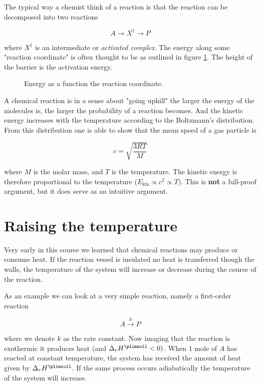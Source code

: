 The typical way a chemist think of a reaction is that the reaction can be decomposed into two reactions \ie

\begin{equation}
    A \rightarrow X^\ddagger \rightarrow P
\end{equation}

where $X^\ddagger$ is an intermediate or \textit{activated complex}. The energy along some "reaction coordinate" is often thought to be as outlined in figure \ref{fig:ActivatedComplex}. The height of the barrier is the activation energy.

\begin{figure}
    \caption{Energy as a function the reaction coordinate.}
    \label{fig:ActivatedComplex}
\end{figure}

A chemical reaction is in a sense about "going uphill" \ie the larger the energy of the molecules is, the larger the probability of a reaction becomes. And the kinetic energy increases with the temperature according to the Boltzmann’s distribution. From this distribution one is able to show that the mean speed of a gas particle is

\begin{equation}
    c = \sqrt{\frac{3RT}{M}}
\end{equation}

where $M$ is the molar mass, and $T$ is the temperature. The kinetic energy is therefore proportional to the temperature ($E_{\mathrm{kin}} \propto c^2 \propto T$). This is \textbf{not} a full-proof argument, but it does serve as an intuitive argument.

\section{Raising the temperature}
\label{sect:RaisingTemperature}

Very early in this course we learned that chemical reactions may produce or consume heat. If the reaction vessel is insulated \ie no heat is transferred though the walls, the temperature of the system will increase or decrease during the course of the reaction.

As an example we can look at a very simple reaction, namely a first-order reaction

\begin{equation}
    A \overset{k}{\rightarrow} P
\end{equation}

where we denote $k$ as the rate constant. Now imaging that the reaction is exothermic \ie it produces heat (and $\Delta_r H^\plimsoll < 0)$. When 1 mole of $A$ has reacted at constant temperature, the system has received the amount of heat given by $\Delta_r H^\plimsoll$. If the same process occurs adiabatically the temperature of the system will increase.

